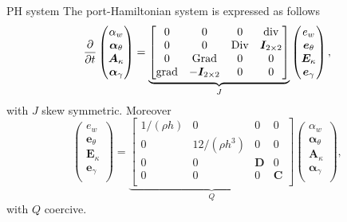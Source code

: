 \documentclass{beamer}
\begin{document}
\begin{frame}{PH system}
The port-Hamiltonian system is expressed as follows 
\begin{equation*}
\diffp{}{t}
\begin{pmatrix}
\alpha_w \\
\bm\alpha_\theta \\
\bm{A}_\kappa \\
\bm\alpha_{\gamma} \\
\end{pmatrix} = 
\underbrace{\begin{bmatrix}
	0  & 0  & 0  & \mathrm{div} \\
	0 & 0 &  \mathrm{Div} & \bm{I}_{2 \times 2}\\
	0  & \mathrm{Grad}  & 0  & 0\\
	\mathrm{grad} & -\bm{I}_{2 \times 2} &  0 & 0  \\
	\end{bmatrix}}_{J}
\begin{pmatrix}
e_w \\
\bm{e}_{\theta} \\
\bm{E}_{\kappa} \\
\bm{e}_{\gamma} \\
\end{pmatrix},
\end{equation*}
with $J$ skew symmetric. Moreover
\begin{equation*}
\begin{pmatrix}
e_w \\
\bm{e}_{\theta} \\
\bm{E}_{\kappa} \\
\bm{e}_{\gamma} \\
\end{pmatrix} = \underbrace{\begin{bmatrix}
	1/(\rho h)  & 0  & 0 & 0 \\
	0 & 12/(\rho h^3)  & 0 & 0 \\
	0 & 0  & \bm{D} & 0 \\
	0 & 0  & 0 & \bm{C} \\
	\end{bmatrix}}_{Q}
\begin{pmatrix}
\alpha_w \\
\bm\alpha_\theta \\
\bm{A}_\kappa \\
\bm\alpha_{\gamma} \\
\end{pmatrix},
\end{equation*}
with $Q$ coercive.
\end{frame}
\end{document}
